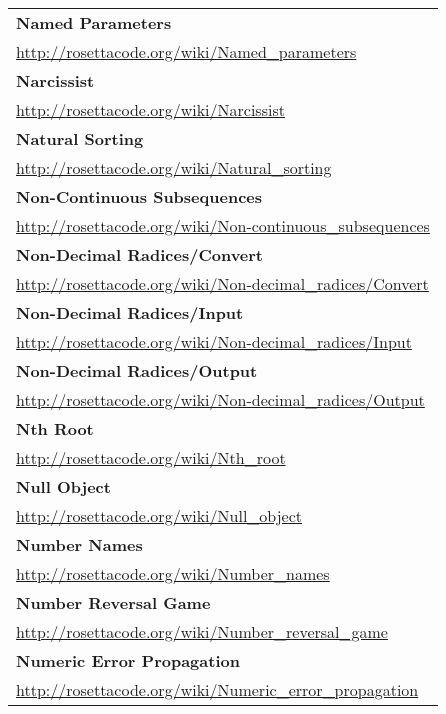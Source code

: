 \begin{longtable}{l}
\textbf{Named Parameters } \\ \href{http://rosettacode.org/wiki/Named\_parameters}{http://rosettacode.org/wiki/Named\_parameters} \\
\textbf{Narcissist } \\ \href{http://rosettacode.org/wiki/Narcissist}{http://rosettacode.org/wiki/Narcissist} \\
\textbf{Natural Sorting } \\ \href{http://rosettacode.org/wiki/Natural\_sorting}{http://rosettacode.org/wiki/Natural\_sorting} \\
\textbf{
Non-Continuous Subsequences } \\ \href{http://rosettacode.org/wiki/Non-continuous\_subsequences}{http://rosettacode.org/wiki/Non-continuous\_subsequences} \\
\textbf{Non-Decimal Radices/Convert } \\ \href{http://rosettacode.org/wiki/Non-decimal\_radices/Convert}{http://rosettacode.org/wiki/Non-decimal\_radices/Convert} \\
\textbf{
Non-Decimal Radices/Input } \\ \href{http://rosettacode.org/wiki/Non-decimal\_radices/Input}{http://rosettacode.org/wiki/Non-decimal\_radices/Input} \\
\textbf{Non-Decimal Radices/Output } \\ \href{http://rosettacode.org/wiki/Non-decimal\_radices/Output}{http://rosettacode.org/wiki/Non-decimal\_radices/Output} \\
\textbf{Nth Root } \\ \href{http://rosettacode.org/wiki/Nth\_root}{http://rosettacode.org/wiki/Nth\_root} \\
\textbf{
Null Object } \\ \href{http://rosettacode.org/wiki/Null\_object}{http://rosettacode.org/wiki/Null\_object} \\
\textbf{Number Names } \\ \href{http://rosettacode.org/wiki/Number\_names}{http://rosettacode.org/wiki/Number\_names} \\
\textbf{Number Reversal Game } \\ \href{http://rosettacode.org/wiki/Number\_reversal\_game}{http://rosettacode.org/wiki/Number\_reversal\_game} \\
\textbf{
Numeric Error Propagation } \\ \href{http://rosettacode.org/wiki/Numeric\_error\_propagation}{http://rosettacode.org/wiki/Numeric\_error\_propagation} \\

\end{longtable}
